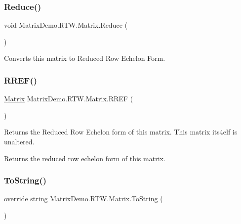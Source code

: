 \subsubsection{\texorpdfstring{Reduce()}{Reduce()}}
{\footnotesize\ttfamily void Matrix\+Demo.\+R\+T\+W.\+Matrix.\+Reduce (\begin{DoxyParamCaption}{ }\end{DoxyParamCaption})}



Converts this matrix to Reduced Row Echelon Form. 

\mbox{\label{class_matrix_demo_1_1_r_t_w_1_1_matrix_ab5b22330a32e73b322522e9c60b8502e}} 
\subsubsection{\texorpdfstring{R\+R\+E\+F()}{RREF()}}
{\footnotesize\ttfamily \mbox{\hyperlink{class_matrix_demo_1_1_r_t_w_1_1_matrix}{Matrix}} Matrix\+Demo.\+R\+T\+W.\+Matrix.\+R\+R\+EF (\begin{DoxyParamCaption}{ }\end{DoxyParamCaption})}



Returns the Reduced Row Echelon form of this matrix. This matrix its4elf is unaltered. 

\begin{DoxyReturn}{Returns}
the reduced row echelon form of this matrix.
\end{DoxyReturn}
\mbox{\label{class_matrix_demo_1_1_r_t_w_1_1_matrix_a6dcaf1d6a6050cea143f68da4a802900}} 
\subsubsection{\texorpdfstring{To\+String()}{ToString()}}
{\footnotesize\ttfamily override string Matrix\+Demo.\+R\+T\+W.\+Matrix.\+To\+String (\begin{DoxyParamCaption}{ }\end{DoxyParamCaption})}



